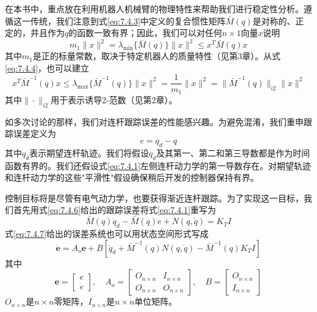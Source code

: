\documentclass[UTF8]{ctexart}
\begin{document}
在本书中，重点放在利用机器人机械臂的物理特性来帮助我们进行稳定性分析。遵循这一传统，我们注意到式\eqref{eq:7.4.3}中定义的复合惯性矩阵$\bar{M}(q)$是对称的、正定的，并且作为$q$的函数一致有界；因此，我们可以对任何$n \times 1$向量$x$说明
\begin{equation}\label{eq:7.4.4}
m_1 \|x\|^2 = \lambda_{\min}\{\bar{M}(q)\}\|x\|^2 \leq x^T \bar{M}(q) x
\end{equation}
其中$m_1$是正的标量常数，取决于特定机器人的质量特性（见第3章）。从式\eqref{eq:7.4.4}，也可以建立
\begin{equation}\label{eq:7.4.5}
x^T \bar{M}^{-1}(q) x \leq \lambda_{\max}\{\bar{M}^{-1}(q)\}\|x\|^2 = \frac{1}{m_1}\|x\|^2 = \|\bar{M}^{-1}(q)\|_{i2}\|x\|^2
\end{equation}
其中$\|\cdot\|_{i2}$用于表示诱导2-范数（见第2章）。

如多次讨论的那样，我们对连杆跟踪误差的性能感兴趣。为避免混淆，我们重申跟踪误差定义为
\begin{equation}\label{eq:7.4.6}
e = q_d - q
\end{equation}
其中$q_d$表示期望连杆轨迹。我们将假设$q_d$及其第一、第二和第三导数都是作为时间函数有界的。我们还假设式\eqref{eq:7.4.1}左侧连杆动力学的第一导数存在。对期望轨迹和连杆动力学的这些"平滑性"假设确保稍后开发的控制器保持有界。

控制目标将是尽管有电气动力学，也要获得渐近连杆跟踪。为了实现这一目标，我们首先用式\eqref{eq:7.4.6}给出的跟踪误差将式\eqref{eq:7.4.1}重写为
\begin{equation}\label{eq:7.4.7}
\bar{M}(q)\ddot{q}_d - \bar{M}(q)\ddot{e} + N(q,\dot{q}) = K_T I
\end{equation}
式\eqref{eq:7.4.7}给出的误差系统也可以用状态空间形式写成
\begin{equation}\label{eq:7.4.8}
\dot{\mathbf{e}} = A_o \mathbf{e} + B\left[\ddot{q}_d + \bar{M}^{-1}(q)N(q,\dot{q}) - \bar{M}^{-1}(q)K_T I\right]
\end{equation}
其中
\begin{equation*}
\mathbf{e} = \begin{bmatrix} e \\ \dot{e} \end{bmatrix}, \quad
A_o = \begin{bmatrix} O_{n \times n} & I_{n \times n} \\ O_{n \times n} & O_{n \times n} \end{bmatrix}, \quad
B = \begin{bmatrix} O_{n \times n} \\ I_{n \times n} \end{bmatrix}
\end{equation*}
$O_{n \times n}$是$n \times n$零矩阵，$I_{n \times n}$是$n \times n$单位矩阵。
\end{document}
